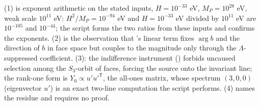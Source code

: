 (1) is exponent arithmetic on the stated inputs, $H = 10^{-33}$ eV, $M_{P} = 10^{28}$ eV, weak scale $10^{11}$ eV: $H^{2}/M_{P} = 10^{-94}$ eV and $H = 10^{-33}$ eV divided by $10^{11}$ eV are $10^{-105}$ and $10^{-44}$; the script forms the two ratios from these inputs and confirms the exponents. (2) is the observation that 's linear term fixes $\arg b$ and the direction of $b$ in face space but couples to the magnitude only through the $\Lambda$-suppressed coefficient. (3): the indifference instrument () forbids uncaused selection among the $S_{3}$-orbit of faces, forcing the source onto the invariant line; the rank-one form is $Y_{0} \propto u'u'^{\mathsf{T}}$, the all-ones matrix, whose spectrum $(3, 0, 0)$ (eigenvector $u'$) is an exact two-line computation the script performs. (4) names the residue and requires no proof.
